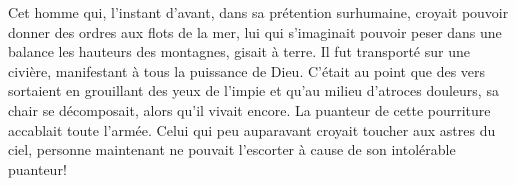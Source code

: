 Cet homme qui, l’instant d’avant, dans sa prétention surhumaine,
	croyait pouvoir donner des ordres aux flots de la mer,
	lui qui s’imaginait pouvoir peser dans une balance les hauteurs des montagnes,
	gisait à terre.
Il fut transporté sur une civière, manifestant à tous la puissance de Dieu.
C’était au point que des vers sortaient en grouillant des yeux de l’impie
	et qu’au milieu d’atroces douleurs, sa chair se décomposait,
	alors qu’il vivait encore.
	La puanteur de cette pourriture accablait toute l’armée.
Celui qui peu auparavant croyait toucher aux astres du ciel,
	personne maintenant ne pouvait l’escorter à cause de son intolérable puanteur!
